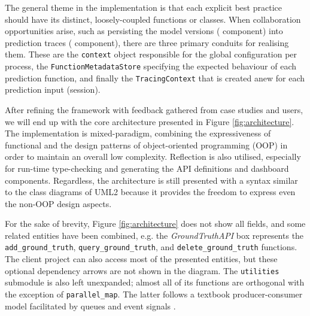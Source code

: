 The general theme in the implementation is that each explicit best practice should have its distinct, loosely-coupled functions or classes. When collaboration opportunities arise, such as persisting the model versions ( component) into prediction traces ( component), there are three primary conduits for realising them. These are the \texttt{context} object responsible for the global configuration per process, the \texttt{FunctionMetadataStore} specifying the expected behaviour of each prediction function, and finally the \texttt{TracingContext} that is created anew for each prediction input (session).

After refining the framework with feedback gathered from case studies and users, we will end up with the core architecture presented in Figure \ref{fig:architecture}. The implementation is mixed-paradigm, combining the expressiveness of functional and the design patterns of object-oriented programming (OOP) in order to maintain an overall low complexity. Reflection is also utilised, especially for run-time type-checking and generating the API definitions and dashboard components. Regardless, the architecture is still presented with a syntax similar to the class diagrams of UML2 \cite{Rumbaugh2004} because it provides the freedom to express even the non-OOP design aspects.

For the sake of brevity, Figure \ref{fig:architecture} does not show all fields, and some related entities have been combined, e.g. the \textit{GroundTruthAPI} box represents the \texttt{add\_ground\_truth}, \texttt{query\_ground\_truth}, and \texttt{delete\_ground\_truth} functions. The client project can also access most of the presented entities, but these optional dependency arrows are not shown in the diagram. The \texttt{utilities} submodule is also left unexpanded; almost all of its functions are orthogonal with the exception of \texttt{parallel\_map}. The latter follows a textbook producer-consumer model facilitated by queues and event signals \cite{wang2020producer}.

